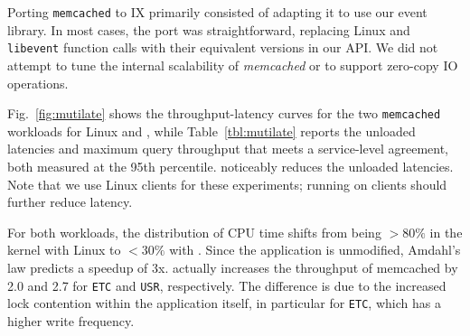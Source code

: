 Porting \texttt{memcached} to IX primarily consisted of adapting it to
use our event library. In most cases, the port was straightforward,
replacing Linux and \texttt{libevent} function calls with their
equivalent versions in our API. %
We did not attempt to tune the internal scalability of {\it memcached}
or to support zero-copy IO operations.




Fig.~\ref{fig:mutilate} shows the throughput-latency curves for the
two \texttt{memcached} workloads for Linux and \ix, while
Table~\ref{tbl:mutilate} reports the unloaded latencies and maximum
query throughput that meets a service-level agreement, both measured at the 95th percentile.
\ix noticeably reduces the unloaded latencies.
Note that we use Linux clients for
these experiments; running \ix on clients should further reduce
latency.



For both workloads, the distribution of CPU time shifts from being
$>80\%$ in the kernel with Linux to $<30\%$ with \ix.  Since the
application is unmodified, Amdahl's law predicts a speedup of 3x.  \ix
actually increases the throughput of memcached by 2.0 and 2.7 for
\texttt{ETC} and \texttt{USR}, respectively.  The difference is due to
the increased lock contention within the application itself, in
particular for \texttt{ETC}, which has a higher write frequency.


%

